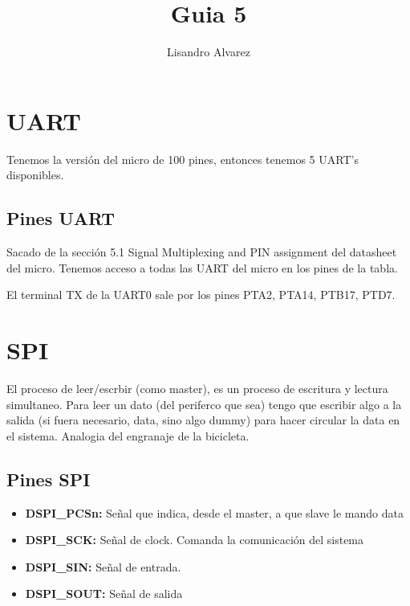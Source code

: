 \documentclass[10pt,a4paper]{article}
\author{Lisandro Alvarez}
\title{Guia 5}
\begin{document}
\section{UART}
Tenemos la versión del micro de 100 pines, entonces tenemos 5 UART's disponibles.
\subsection{Pines UART}
Sacado de la sección 5.1 Signal Multiplexing and PIN assignment del datasheet del micro.
Tenemos acceso a todas las UART del micro en los pines de la tabla. 

\begin{table}[h]
\centering
{}
\end{table}

El terminal TX de la UART0 sale por los pines PTA2, PTA14, PTB17, PTD7.


\section{SPI}

El proceso de leer/escrbir (como master), es un proceso de escritura y lectura simultaneo. Para leer un dato (del periferco que sea) tengo que escribir algo a la salida (si fuera necesario, data, sino algo dummy) para hacer circular la data en el sistema. Analogia del engranaje de la bicicleta.

\subsection{Pines SPI}
\begin{itemize}
\item \textbf{DSPI\_PCSn: }Señal que indica, desde el master, a que slave le mando data 
\item \textbf{DSPI\_SCK: }Señal de clock. Comanda la comunicación del sistema
\item \textbf{DSPI\_SIN: }Señal de entrada.
\item \textbf{DSPI\_SOUT: }Señal de salida
\end{itemize}
\end{document}
